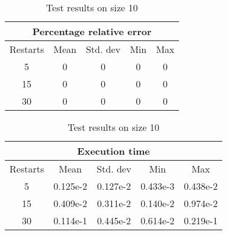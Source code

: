 

\begin{table}[h]
	\caption{Test results on size 10}
	\label{tab:t10}
	\setlength\tabcolsep{4pt}
	\begin{subtable}[t]{0.35\linewidth}
		\centering
		\begin{tabular}[t]{ccccc}
			\hline
			\multicolumn{5}{c}{Percentage relative error}            \\ \hline
			Restarts & Mean & Std. dev & Min & Max \\ \hline
			5        & 0    & 0        & 0   & 0   \\
			15       & 0    & 0        & 0   & 0   \\
			30       & 0    & 0        & 0   & 0  
		\end{tabular}
	\end{subtable}
	\hspace{1.8cm}
	\begin{subtable}[t]{0.42\linewidth}
		\centering
		\begin{tabular}[t]{ccccc}
			\hline
			\multicolumn{5}{c}{Execution time}            \\ \hline
			Restarts & Mean & Std. dev & Min & Max \\ \hline
			5 & 0.125e-2 & 0.127e-2 & 0.433e-3 & 0.438e-2 \\
			15 & 0.409e-2 & 0.311e-2 & 0.140e-2 & 0.974e-2 \\
			30 & 0.114e-1 & 0.445e-2 & 0.614e-2 & 0.219e-1  
		\end{tabular}
	\end{subtable}
\end{table}

